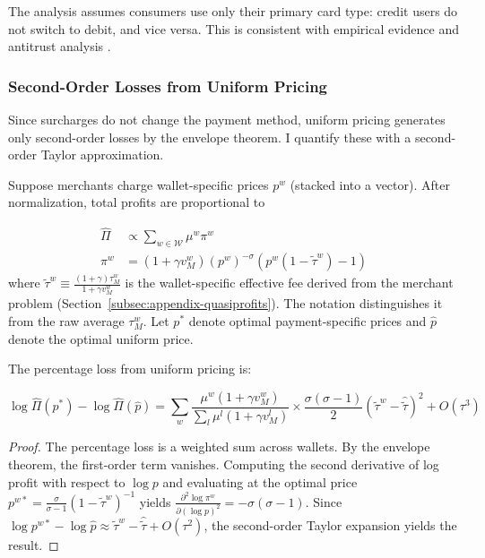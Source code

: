 \documentclass[main.tex]{subfiles}
\begin{document}
The analysis assumes consumers use only their primary card type: credit users do not switch to debit, and vice versa.
This is consistent with empirical evidence \parencite{Conrath2014} and antitrust analysis \parencite{Jones2001}.

\subsubsection{Second-Order Losses from Uniform Pricing}

Since surcharges do not change the payment method, uniform pricing generates only second-order losses by the envelope theorem.
I quantify these with a second-order Taylor approximation.

Suppose merchants charge wallet-specific prices $p^{w}$ (stacked into a vector).
After normalization, total profits are proportional to

\begin{align*}
\widehat{\Pi} & \propto\sum_{w\in\mathcal{W}}\mu^{w}\pi^{w}\\
\pi^{w} & =\left(1+\gamma v_{M}^{w}\right)\left(p^{w}\right)^{-\sigma}\left(p^{w}\left(1-\tilde{\tau}^{w}\right)-1\right)
\end{align*}
where $\tilde{\tau}^{w}\equiv\frac{(1+\gamma)\tau_M^w}{1+\gamma v_M^w}$ is the wallet-specific effective fee derived from the merchant problem (Section~\ref{subsec:appendix-quasiprofits}). The notation distinguishes it from the raw average $\tau_M^w$.
Let $p^{*}$ denote optimal payment-specific prices and $\hat{p}$ denote the optimal uniform price.

\begin{theorem}
The percentage loss from uniform pricing is:

\[
\log\widehat{\Pi}\left(p^{*}\right)-\log\widehat{\Pi}\left(\hat{p}\right)=\sum_{w}\frac{\mu^{w}\left(1+\gamma v_{M}^{w}\right)}{\sum_{l}\mu^{l}\left(1+\gamma v_{M}^{l}\right)}\times\frac{\sigma\left(\sigma-1\right)}{2}\left(\tilde{\tau}^{w}-\hat{\tilde{\tau}}\right)^{2}+O\left(\tau^{3}\right)
\]
\end{theorem}

\begin{proof}
The percentage loss is a weighted sum across wallets.
By the envelope theorem, the first-order term vanishes.
Computing the second derivative of log profit with respect to $\log p$ and evaluating at the optimal price $p^{w*}=\frac{\sigma}{\sigma-1}\left(1-\tilde{\tau}^{w}\right)^{-1}$ yields $\frac{\partial^{2}\log\pi^{w}}{\partial\left(\log p\right)^{2}}=-\sigma\left(\sigma-1\right)$.
Since $\log p^{w*}-\log\hat{p}\approx\tilde{\tau}^{w}-\hat{\tilde{\tau}}+O(\tau^2)$, the second-order Taylor expansion yields the result.

\end{proof}
\end{document}
